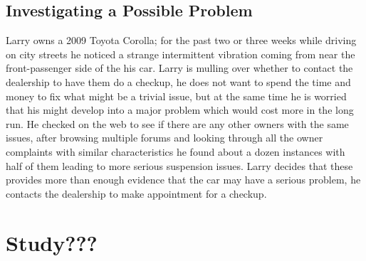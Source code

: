\subsection{Investigating a Possible Problem}
Larry owns a 2009 Toyota Corolla; for the past two or three weeks while driving
on city streets he noticed a strange intermittent vibration coming from near the 
front-passenger side of the his car. Larry is mulling over whether to contact the 
dealership to have them do a checkup, he does not want to spend the time and
money to fix what might be a trivial issue, but at the same time he is worried that his 
might develop into a major problem which would cost more in the long run. He 
checked on the web to see if there are any other owners with the same issues, after 
browsing multiple forums and looking through all the owner complaints with similar 
characteristics he found about a dozen instances with half of them leading to more 
serious suspension issues. Larry decides that these provides more than enough evidence 
that the car may have a serious problem, he contacts the dealership to make 
appointment for a checkup.

\section{Study???}